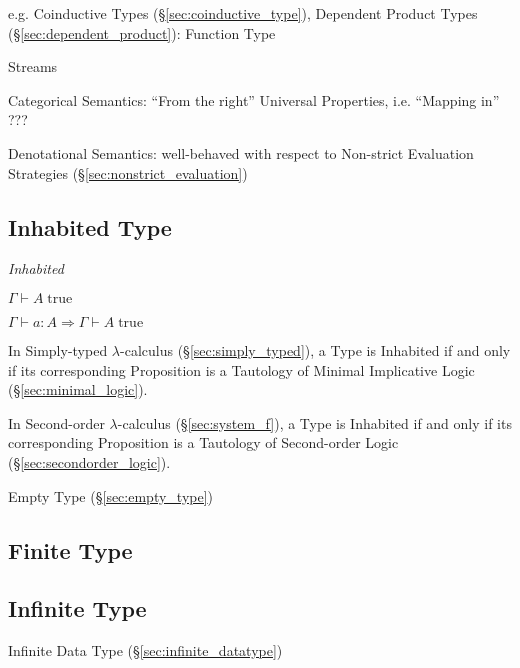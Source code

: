 e.g. Coinductive Types (\S\ref{sec:coinductive_type}), Dependent
Product Types (\S\ref{sec:dependent_product}): Function Type

Streams

Categorical Semantics: ``From the right'' Universal Properties, i.e.
``Mapping in'' ???

Denotational Semantics: well-behaved with respect to Non-strict
Evaluation Strategies (\S\ref{sec:nonstrict_evaluation})



\subsection{Inhabited Type}\label{sec:inhabited_type}

\emph{Inhabited}

$\Gamma \vdash A\;\mathrm{true}$

$\Gamma \vdash a:A \Rightarrow \Gamma \vdash A\;\mathrm{true}$

In Simply-typed $\lambda$-calculus (\S\ref{sec:simply_typed}), a Type
is Inhabited if and only if its corresponding Proposition is a
Tautology of Minimal Implicative Logic (\S\ref{sec:minimal_logic}).

In Second-order $\lambda$-calculus (\S\ref{sec:system_f}), a
Type is Inhabited if and only if its corresponding Proposition is a
Tautology of Second-order Logic (\S\ref{sec:secondorder_logic}).

Empty Type (\S\ref{sec:empty_type})



\subsection{Finite Type}\label{sec:finite_type}

\subsection{Infinite Type}\label{sec:infinite_type}

Infinite Data Type (\S\ref{sec:infinite_datatype})



